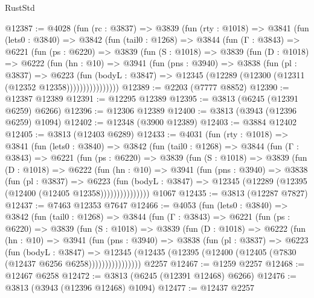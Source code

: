 \begin{lexlean}{RustStd}
\begin{coremodule}
{\begin{coremodule}
{{{{{{{{{{{{{{{{{{{{{{{{{{{{{{{{{{{@12387 := @4028
    (fun (rc : @3837) =>
    @3839
      (fun (rty : @1018) =>
      @3841
        (fun (lets0 : @3840) =>
        @3842
          (fun (tail0 : @1268) =>
          @3844
            (fun (Γ : @3843) =>
            @6221
              (fun (ps : @6220) =>
              @3839
                (fun (S : @1018) =>
                @3839
                  (fun (D : @1018) =>
                  @6222
                    (fun (hn : @10) =>
                    @3941
                      (fun (pns : @3940) =>
                      @3838
                        (fun (pl : @3837) =>
                        @6223
                          (fun (bodyL : @3847) =>
                          @12345 (@12289 (@12300 (@12311 (@12352 @12358))))))))))))))))
@12389 := @2203 (@7777 @8852)
@12390 := @12387 @12389
@12391 := @12295 @12389
@12395 := @3813 (@6245 (@12391 @6259) @6266)
@12396 := @12306 @12389
@12400 := @3813 (@3943 (@12396 @6259) @1094)
@12402 := @12348 (@3900 @12389)
@12403 := @3884 @12402
@12405 := @3813 (@12403 @6289)
@12433 := @4031
    (fun (rty : @1018) =>
    @3841
      (fun (lets0 : @3840) =>
      @3842
        (fun (tail0 : @1268) =>
        @3844
          (fun (Γ : @3843) =>
          @6221
            (fun (ps : @6220) =>
            @3839
              (fun (S : @1018) =>
              @3839
                (fun (D : @1018) =>
                @6222
                  (fun (hn : @10) =>
                  @3941
                    (fun (pns : @3940) =>
                    @3838
                      (fun (pl : @3837) =>
                      @6223
                        (fun (bodyL : @3847) =>
                        @12345 (@12289 (@12395 (@12400 (@12405 @12358)))))))))))))))
    @1067
@12435 := @3813 (@12287 @7827)
@12437 := @7463 @12353 @7647
@12466 := @4053
    (fun (lets0 : @3840) =>
    @3842
      (fun (tail0 : @1268) =>
      @3844
        (fun (Γ : @3843) =>
        @6221
          (fun (ps : @6220) =>
          @3839
            (fun (S : @1018) =>
            @3839
              (fun (D : @1018) =>
              @6222
                (fun (hn : @10) =>
                @3941
                  (fun (pns : @3940) =>
                  @3838
                    (fun (pl : @3837) =>
                    @6223
                      (fun (bodyL : @3847) =>
                      @12345
                        (@12435 (@12395 (@12400 (@12405 (@7830 (@12437 @6256 @6258))))))))))))))))
    @2257
@12467 := @1259 @2257
@12468 := @12467 @6258
@12472 := @3813 (@6245 (@12391 @12468) @6266)
@12476 := @3813 (@3943 (@12396 @12468) @1094)
@12477 := @12437 @2257
}}}}}}}}}}}}}}}}}}}}}}}}}}}}}}}}}}}
\end{coremodule}}
\end{coremodule}
\end{lexlean}
